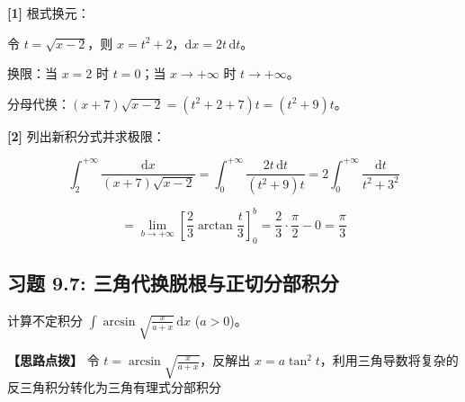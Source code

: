 \documentclass[11pt,a4paper,UTF8]{ctexart}
\begin{document}
\begin{solbox}[分步推导与答题规范]
\textbf{[1]} 根式换元：

令 $t = \sqrt{x-2}$，则 $x = t^2 + 2$，$\mathrm{d}x = 2t\,\mathrm{d}t$。

换限：当 $x=2$ 时 $t=0$；当 $x \to +\infty$ 时 $t \to +\infty$。

分母代换：$(x+7)\sqrt{x-2} = (t^2+2+7)t = (t^2+9)t$。

\textbf{[2]} 列出新积分式并求极限：


\begin{equation*}
\int_2^{+\infty} \frac{\mathrm{d}x}{(x+7)\sqrt{x-2}} = \int_0^{+\infty} \frac{2t\,\mathrm{d}t}{(t^2+9)t} = 2\int_0^{+\infty} \frac{\mathrm{d}t}{t^2+3^2}
\end{equation*}



\begin{equation*}
= \lim_{b \to +\infty} \left[ \frac{2}{3}\arctan\frac{t}{3} \right]_0^b = \frac{2}{3} \cdot \frac{\pi}{2} - 0 = \frac{\pi}{3}
\end{equation*}

\end{solbox}


\subsection{习题 9.7: 三角代换脱根与正切分部积分}

计算不定积分 $\int \arcsin\sqrt{\frac{x}{a+x}}\,\mathrm{d}x$ ($a > 0$)。

\textbf{\color{DeepPurple}【思路点拨】} 令 $t = \arcsin\sqrt{\frac{x}{a+x}}$，反解出 $x = a\tan^2 t$，利用三角导数将复杂的反三角积分转化为三角有理式分部积分
\end{document}
